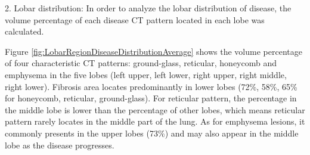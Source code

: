 2. Lobar distribution: In order to analyze the lobar distribution of disease, the volume percentage of each disease CT pattern located in each lobe was calculated.

Figure \ref{fig:LobarRegionDiseaseDistributionAverage} shows the volume percentage of four characteristic CT patterns: ground-glass, reticular, honeycomb and emphysema in the five lobes (left upper, left lower, right upper, right middle, right lower). Fibrosis area locates predominantly in lower lobes (72\%, 58\%, 65\% for honeycomb, reticular, ground-glass). For reticular pattern, the percentage in the middle lobe is lower than the percentage of other lobes, which means reticular pattern rarely locates in the middle part of the lung. As for emphysema lesions, it commonly presents in the upper lobes (73\%) and may also appear in the middle lobe as the disease progresses.

